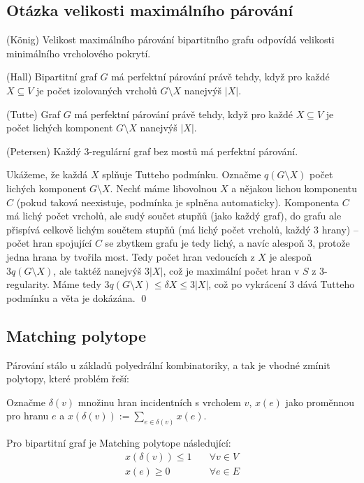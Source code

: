 \subsection{Otázka velikosti maximálního párování}

\vt (König) Velikost maximálního párování bipartitního grafu odpovídá velikosti
minimálního vrcholového pokrytí.

\vt (Hall) Bipartitní graf $G$ má perfektní párování právě tehdy, když pro každé
$X \subseteq V$ je počet izolovaných vrcholů $G \setminus X$ nanejvýš $|X|$.

\vt (Tutte) Graf $G$ má perfektní párování právě tehdy, když pro každé $X
\subseteq V$ je počet lichých komponent $G \setminus X$ nanejvýš $|X|$.

\vt (Petersen) Každý 3-regulární graf bez mostů má perfektní párování.

\dk Ukážeme, že každá $X$ splňuje Tutteho podmínku. Označme $q(G \setminus X)$
počet lichých komponent $G \setminus X$. Nechť máme libovolnou $X$ a nějakou
lichou komponentu $C$ (pokud taková neexistuje, podmínka je splněna
automaticky).  Komponenta $C$ má lichý počet vrcholů, ale sudý součet stupňů
(jako každý graf), do grafu ale přispívá celkově lichým součtem stupňů (má lichý
počet vrcholů, každý 3 hrany) -- počet hran spojující $C$ se zbytkem grafu je
tedy lichý, a navíc alespoň $3$, protože jedna hrana by tvořila most. Tedy počet
hran vedoucích z $X$ je alespoň $3q(G \setminus X)$, ale taktéž nanejvýš $3|X|$,
což je maximální počet hran v $S$ z $3$-regularity. Máme tedy $3q(G \setminus X)
\leq\delta X \leq 3|X|$, což po vykrácení $3$ dává Tutteho podmínku a věta je
dokázána. \qed


\subsection{Matching polytope}

Párování stálo u základů polyedrální kombinatoriky, a tak je vhodné zmínit
polytopy, které problém řeší:

\df Označme $\delta(v)$ množinu hran incidentních s vrcholem $v$, $x(e)$ jako
proměnnou pro hranu $e$ a $x(\delta(v)) := \sum_{e \in\delta(v)} x(e)$.

\tv Pro bipartitní graf je Matching polytope následující:
\begin{align}
	x(\delta(v)) \leq 1  & \quad  \forall v \in V \\
	x(e) \geq 0 & \quad \forall e  \in E
\end{align}


